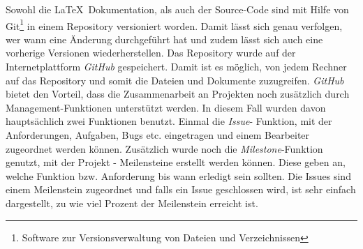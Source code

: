 Sowohl die \LaTeX\ Dokumentation, als auch der Source-Code sind mit Hilfe von Git\footnote{Software zur Versionsverwaltung von Dateien und Verzeichnissen}  in einem Repository versioniert worden. Damit lässt sich genau verfolgen, wer wann eine Änderung durchgeführt hat und zudem lässt sich auch eine vorherige Versionen wiederherstellen.
Das Repository wurde auf der Internetplattform \textit{GitHub} gespeichert. Damit ist es möglich, von jedem Rechner auf das Repository und somit die Dateien und Dokumente zuzugreifen. \textit{GitHub} bietet den Vorteil, dass die Zusammenarbeit an Projekten noch zusätzlich durch Management-Funktionen unterstützt werden. In diesem Fall wurden davon hauptsächlich zwei Funktionen benutzt. Einmal die \textit{Issue}- Funktion, mit der Anforderungen, Aufgaben, Bugs etc. eingetragen und einem Bearbeiter zugeordnet werden können. Zusätzlich wurde noch die \textit{Milestone}-Funktion genutzt, mit der Projekt - Meilensteine erstellt werden können. Diese geben an, welche Funktion bzw. Anforderung bis wann erledigt sein sollten. Die Issues sind einem Meilenstein zugeordnet und falls ein Issue geschlossen wird, ist sehr einfach dargestellt, zu wie viel Prozent der Meilenstein erreicht ist.
